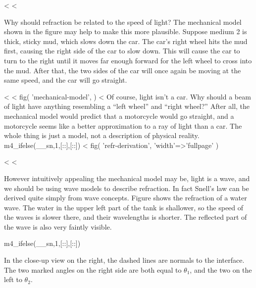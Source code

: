 <%
<%

Why should refraction be related to the speed of light? The
mechanical model shown in the figure may help to make this
more plausible. Suppose medium 2 is thick, sticky mud, which
slows down the car. The car's right wheel hits the mud
first, causing the right side of the car to slow down. This
will cause the car to turn to the right until it moves far
enough forward for the left wheel to cross into the mud.
After that, the two sides of the car will once again be
moving at the same speed, and the car will go straight.

<%
<%
  fig(
    'mechanical-model',
  )
<%
Of course, light isn't a car. Why should a beam of light
have anything resembling a ``left wheel'' and ``right
wheel?'' After all, the mechanical model would predict that
a motorcycle would go straight, and a motorcycle seems like
a better approximation to a ray of light than a car. The
whole thing is just a model, not a description of physical reality.
m4_ifelse(__sn,1,[::],[:\vspace{0mm plus 5mm}:])
<%
  fig(
    'refr-derivation',
    {
      'width'=>'fullpage'
    }
  )

<%
<%

However intuitively appealing the mechanical model may be,
light is a wave, and we should be using wave models to
describe refraction. In fact Snell's law can be derived
quite simply from wave concepts. Figure  shows
the refraction of a water wave. The water in the upper left part of the tank
is shallower, so the speed of the waves is slower there, and their
wavelengths is shorter. The reflected part of the wave is also very faintly
visible.

m4_ifelse(__sn,1,[::],[:\pagebreak:])

In the close-up view on the right, the dashed lines are normals to the
interface. The two marked angles on the right side are both equal to
$\theta_1$, and the two on the left to $\theta_2$.

